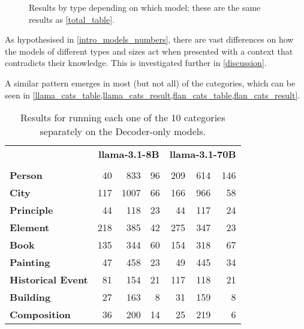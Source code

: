 \begin{figure}[H]
	\centering
	\caption{Results by type depending on which model; these are the same results as \cref{total_table}.}
	\label{total_results}
\end{figure}

As hypothesised in \cref{intro_models_numbers}, there are vast differences on how the models of different types and sizes act when presented with a context that contradicts their knowledge.
This is investigated further in \cref{discussion}.

A similar pattern emerges in most (but not all) of the categories, which can be seen in \cref{llama_cats_table,llama_cats_result,flan_cats_table,flan_cats_result}.

\begin{table}[htbp]
	\centering
	\footnotesize
	\begin{tabular}{>{\bfseries}l | r r r | r r r}
		\toprule
			& \multicolumn{3}{c|}{\ttfamily \bfseries llama-3.1-8B} & \multicolumn{3}{c}{\ttfamily \bfseries llama-3.1-70B} \\
			& \Parametric{} & \Contextual{} & \Other{} & \Parametric{} & \Contextual{} & \Other{} \\
		\midrule
			Person           &  40 &  833 & 96 & 209 & 614 & 146 \\
			City             & 117 & 1007 & 66 & 166 & 966 &  58 \\
			Principle        &  44 &  118 & 23 &  44 & 117 &  24 \\
			Element          & 218 &  385 & 42 & 275 & 347 &  23 \\
			Book             & 135 &  344 & 60 & 154 & 318 &  67 \\
			Painting         &  47 &  458 & 23 &  49 & 445 &  34 \\
			Historical Event &  81 &  154 & 21 & 117 & 118 &  21 \\
			Building         &  27 &  163 &  8 &  31 & 159 &   8 \\
			Composition      &  36 &  200 & 14 &  25 & 219 &   6 \\
		\bottomrule
	\end{tabular}
	\caption{Results for running each one of the 10 categories separately on the Decoder-only models.}
	\label{llama_cats_table}
\end{table}


